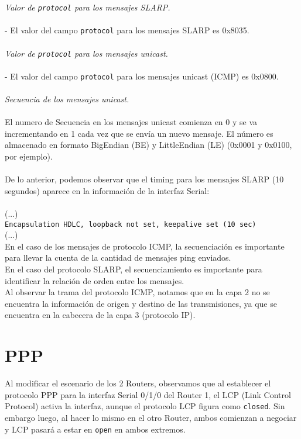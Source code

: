 \documentclass{article}
\begin{document}
\textit{Valor de \texttt{protocol} para los mensajes SLARP.} \\\\
- El valor del campo \texttt{protocol} para los mensajes SLARP es 0x8035.\\\\

\textit{Valor de \texttt{protocol} para los mensajes unicast.} \\\\
- El valor del campo \texttt{protocol} para los mensajes unicast (ICMP) es 0x0800. \\\\

\textit{Secuencia de los mensajes unicast.} \\\\
El numero de Secuencia en los mensajes unicast comienza en 0 y se va incrementando en 1 cada vez que se envía un nuevo mensaje. El número es almacenado en formato BigEndian (BE) y LittleEndian (LE) (0x0001 y 0x0100, por ejemplo). \\\\

De lo anterior, podemos observar que el timing para los mensajes SLARP (10 segundos) aparece en la información de la interfaz Serial: \\\\
(...) \\
\texttt{Encapsulation HDLC, loopback not set, keepalive set (10 sec)} \\
(...) \\

En el caso de los mensajes de protocolo ICMP, la secuenciación es importante para llevar la cuenta de la cantidad de mensajes ping enviados. \\

En el caso del protocolo SLARP, el secuenciamiento es importante para identificar la relación de orden entre los mensajes. \\

Al observar la trama del protocolo ICMP, notamos que en la capa 2 no se encuentra la información de origen y destino de las transmisiones, ya que se encuentra en la cabecera de la capa 3 (protocolo IP). \\

\section{PPP}

Al modificar el escenario de los 2 Routers, observamos que al establecer el protocolo PPP para la interfaz Serial 0/1/0 del Router 1, el LCP (Link Control Protocol) activa la interfaz, aunque el protocolo LCP figura como \texttt{closed}. Sin embargo luego, al hacer lo mismo en el otro Router, ambos comienzan a negociar y LCP pasará a estar en \texttt{open} en ambos extremos. \\
\end{document}
